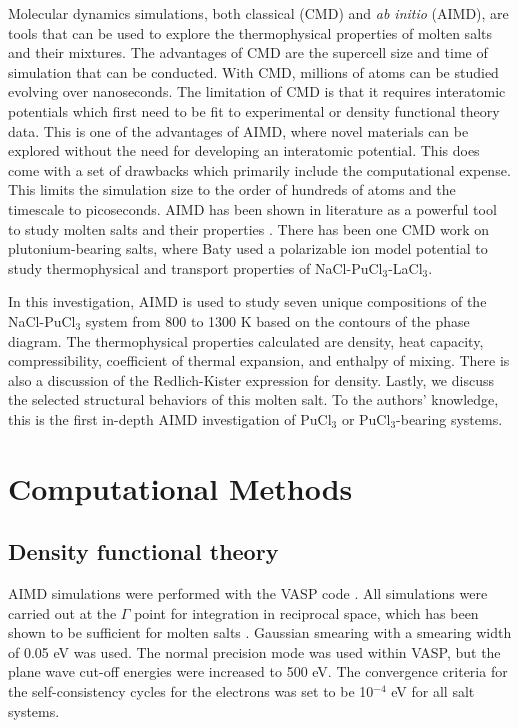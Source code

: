 \documentclass[review]{elsarticle}
\begin{document}
Molecular dynamics simulations, both classical (CMD) and \textit{ab initio} (AIMD), are tools that can be used to explore the thermophysical properties of molten salts and their mixtures. The advantages of CMD are the supercell size and time of simulation that can be conducted. With CMD, millions of atoms can be studied evolving over nanoseconds. The limitation of CMD is that it requires interatomic potentials which first need to be fit to experimental or density functional theory data. This is one of the advantages of AIMD, where novel materials can be explored without the need for developing an interatomic potential. This does come with a set of drawbacks which primarily include the computational expense. This limits the simulation size to the order of hundreds of atoms and the timescale to picoseconds. AIMD has been shown in literature as a powerful tool to study molten salts and their properties \cite{Bengston2014, duemmler_liclkcl, duemmler_naclmgcl, Song2017}. There has been one CMD work on plutonium-bearing salts, where Baty \cite{baty2013molecular} used a polarizable ion model potential to study thermophysical and transport properties of NaCl-PuCl$_3$-LaCl$_3$. 

In this investigation, AIMD is used to study seven unique compositions of the NaCl-PuCl$_3$ system from 800 to 1300 K based on the contours of the phase diagram. The thermophysical properties calculated are density, heat capacity, compressibility, coefficient of thermal expansion, and enthalpy of mixing. There is also a discussion of the Redlich-Kister expression for density. Lastly, we discuss the selected structural behaviors of this molten salt. To the authors' knowledge, this is the first in-depth AIMD investigation of PuCl$_3$ or PuCl$_3$-bearing systems.

\section{Computational Methods}
\subsection{Density functional theory}
AIMD simulations were performed with the VASP code \cite{Kresse1993, Kresse1996, Kresse1996a}. All simulations were carried out at the $\Gamma$ point for integration in reciprocal space, which has been shown to be sufficient for molten salts \cite{NAM2015224, Bengston2014, ANDERSSON2022153836,duemmler_liclkcl,duemmler_naclmgcl}. Gaussian smearing with a smearing width of 0.05 eV was used. The normal precision mode was used within VASP, but the plane wave cut-off energies were increased to 500 eV. The convergence criteria for the self-consistency cycles for the electrons was set to be 10$^{-4}$ eV for all salt systems. 
\end{document}
